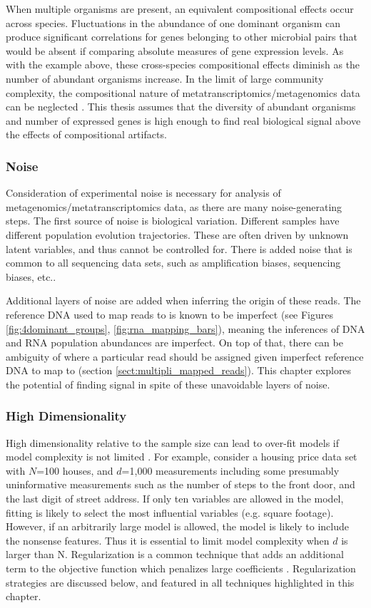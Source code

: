 When multiple organisms are present, an equivalent compositional effects occur across species.
Fluctuations in the abundance of one dominant organism can produce significant correlations for genes belonging to other microbial pairs that would be absent if comparing absolute measures of gene expression levels.
As with the example above, these cross-species compositional effects diminish as the number of abundant organisms increase.
In the limit of large community complexity, the compositional nature of metatranscriptomics/metagenomics data can be neglected \cite{tsilimigras2016}.
This thesis assumes that the diversity of abundant organisms and number of expressed genes is high enough to find real biological signal above the effects of compositional artifacts.

\subsubsection{Noise}
Consideration of experimental noise is necessary for analysis of metagenomics/metatranscriptomics data, as there are many noise-generating steps.
The first source of noise is biological variation.
Different samples have different population evolution trajectories.
These are often driven by unknown latent variables, and thus cannot be controlled for.
There is added noise that is common to all sequencing data sets, such as amplification biases, sequencing biases, etc..

Additional layers of noise are added when inferring the origin of these reads.
The reference DNA used to map reads to is known to be imperfect (see Figures \ref{fig:4dominant_groups}, \ref{fig:rna_mapping_bars}), meaning the inferences of DNA and RNA population abundances are imperfect.
On top of that, there can be ambiguity of where a particular read should be assigned given imperfect reference DNA to map to (section \ref{sect:multipli_mapped_reads}).
This chapter explores the potential of finding signal in spite of these unavoidable layers of noise.

\subsubsection{High Dimensionality}
High dimensionality relative to the sample size can lead to over-fit models if model complexity is not limited \cite{friedman2001}. %
For example, consider a housing price data set with $N$=100 houses, and $d$=1,000 measurements including some presumably uninformative measurements such as the number of steps to the front door, and the last digit of street address.
If only ten variables are allowed in the model, fitting is likely to select the most influential variables (e.g. square footage).
However, if an arbitrarily large model is allowed, the model is likely to include the nonsense features.
Thus it is essential to limit model complexity when $d$ is larger than N.
Regularization is a common technique that adds an additional term to the objective function which penalizes large coefficients \cite{friedman2001}.
Regularization strategies are discussed below, and featured in all techniques highlighted in this chapter.

